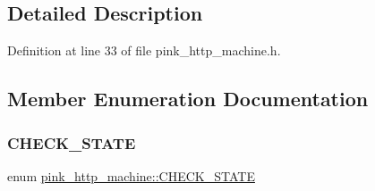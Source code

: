 \subsection{Detailed Description}


Definition at line 33 of file pink\+\_\+http\+\_\+machine.\+h.



\subsection{Member Enumeration Documentation}
\mbox{\label{classpink__http__machine_aeb5dafe8258708065e5c09565dd37f9e}} 
\subsubsection{\texorpdfstring{C\+H\+E\+C\+K\+\_\+\+S\+T\+A\+TE}{CHECK\_STATE}}
{\footnotesize\ttfamily enum \hyperlink{classpink__http__machine_aeb5dafe8258708065e5c09565dd37f9e}{pink\+\_\+http\+\_\+machine\+::\+C\+H\+E\+C\+K\+\_\+\+S\+T\+A\+TE}}

